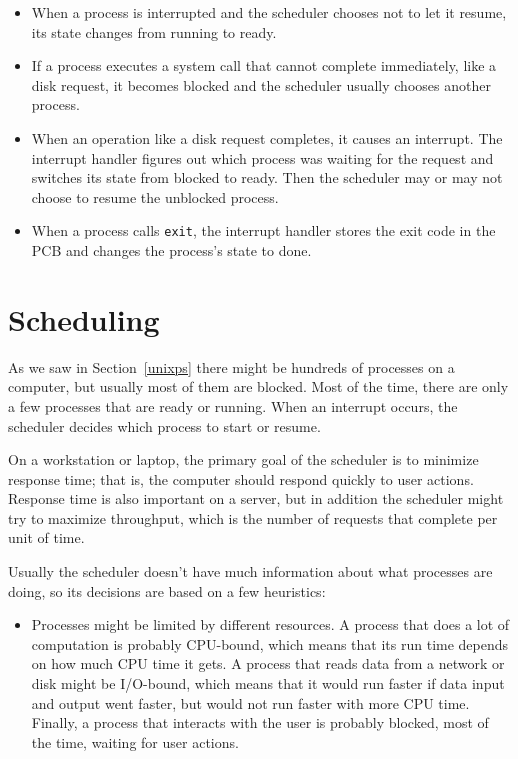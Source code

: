\documentclass[12pt]{book}
\begin{document}
{\begin{itemize}
\item When a process is interrupted and the scheduler chooses not
  to let it resume, its state changes from running to ready.

\item If a process executes a system call that cannot complete
  immediately, like a disk request, it becomes blocked
  and the scheduler usually chooses another process.

\item When an operation like a disk request completes, it causes an
  interrupt.  The interrupt handler figures out which process was
  waiting for the request and switches its state from
  blocked to ready.  Then the scheduler may or may not choose to
  resume the unblocked process.

\item When a process calls {\tt exit}, the interrupt handler stores
  the exit code in the PCB and changes the process's state to done.

\end{itemize}


\section{Scheduling}

As we saw in Section~\ref{unixps} there might be hundreds of
processes on a computer, but usually most of them are blocked.  Most
of the time, there are only a few processes that are ready or running.
When an interrupt occurs, the scheduler decides which process to start
or resume.

On a workstation or laptop, the primary goal of the scheduler is to
minimize response time; that is, the computer should respond quickly
to user actions.  Response time is also important on a server, but in
addition the scheduler might try to maximize throughput, which is the
number of requests that complete per unit of time.

Usually the scheduler doesn't have much information about what
processes are doing, so its decisions are based on a few
heuristics:

\begin{itemize}

\item Processes might be limited by different resources.  A process
that does a lot of computation is probably CPU-bound, which means that
its run time depends on how much CPU time it gets.  A process that
reads data from a network or disk might be I/O-bound, which means that
it would run faster if data input and output went faster, but would not
run faster with more CPU time.  Finally, a process that interacts with
the user is probably blocked, most of the time, waiting for user actions.


\end{itemize}}
\end{document}

